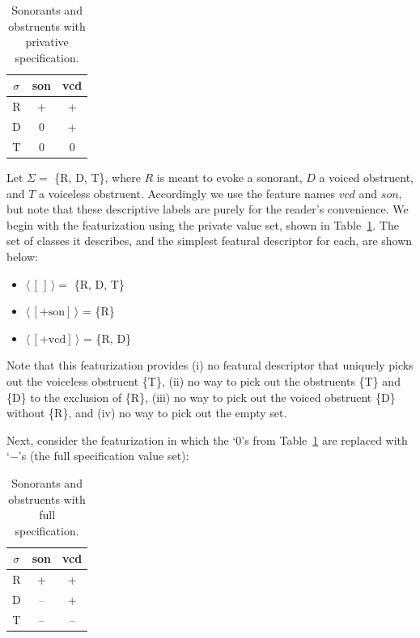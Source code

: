 \documentclass[11pt, oneside]{article}   	%
\begin{document}
\begin{table}[h]
	\centering
	\begin{tabular} {|c||c|c|}
		\hline
		$\sigma$ & son & vcd \\ \hline
		R & + & + \\
		D & 0 & + \\
		T & 0 & 0 \\
		\hline
	\end{tabular}
	\caption{Sonorants and obstruents with privative specification.}
	\label{table:privative}
\end{table}

\noindent Let $\Sigma =$ \{R, D, T\}, where $R$ is meant to evoke a sonorant, $D$ a voiced obstruent, and $T$ a voiceless obstruent. Accordingly we use the feature names $vcd$ and $son$, but note that these descriptive labels are purely for the reader's convenience. We begin with the featurization using the private value set, shown in Table~\ref{table:privative}. The set of classes it describes, and the simplest featural descriptor for each, are shown below:

\begin{itemize}
  \item $\langle \, [\,] \, \rangle = $ \{R, D, T\}
  \item $\langle \, [+\text{son}] \, \rangle$ = \{R\}
  \item $\langle \, [+\text{vcd}] \, \rangle$ = \{R, D\}
\end{itemize}
  
\noindent Note that this featurization provides (i) no featural descriptor that uniquely picks out the voiceless obstruent \{T\}, (ii) no way to pick out the obstruents \{T\} and \{D\} to the exclusion of \{R\}, (iii) no way to pick out the voiced obstruent \{D\} without \{R\}, and (iv) no way to pick out the empty set.

Next, consider the featurization in which the `$0$'s from Table~\ref{table:privative} are replaced with `$-$'s (the full specification value set):

\begin{table}[h]
    \centering
    \begin{tabular} {|c||c|c|}
    \hline
        $\sigma$ & son & vcd \\ \hline
        R & + & + \\
        D & -- & + \\
        T & -- & -- \\
        \hline
    \end{tabular}
    \caption{Sonorants and obstruents with full specification.}
    \label{table:full}
\end{table}
\end{document}
